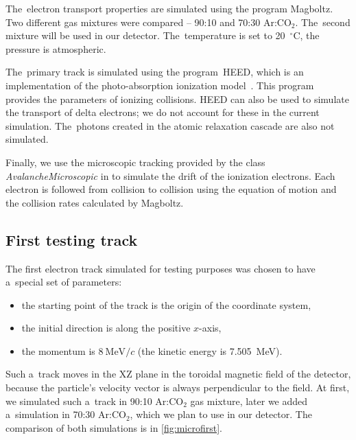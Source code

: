 		The~electron transport properties are simulated using the program Magboltz. Two different gas mixtures were compared -- 90:10 and 70:30 Ar:CO$_2$. The~second mixture will be used in our detector. The~temperature is set to 20~$^\circ$C, the pressure is atmospheric.
		
		The~primary track is simulated using the program~\ac{HEED}, which is an implementation of the photo-absorption ionization model~\cite{HEED}. This program provides the parameters of ionizing collisions. \ac{HEED} can also be used to simulate the transport of delta electrons; we do not account for these in the current simulation. The~photons created in the atomic relaxation cascade are also not simulated.
		
		Finally, we use the microscopic tracking provided by the class \textit{AvalancheMicroscopic} in \garfieldpp to simulate the drift of the ionization electrons. Each electron is followed from collision to collision using the equation of motion and the collision rates calculated by Magboltz.
		
		
		\subsection{First testing track}
		\label{sec:microfirst}
			The first electron track simulated for testing purposes was chosen to have a~special set of parameters:
				\begin{itemize}[nosep]
					\item the starting point of the track is the origin of the coordinate system,
					\item the initial direction is along the positive $x$-axis,
					\item the momentum is $8~\text{MeV}/c$ (the kinetic energy is 7.505~MeV).
				\end{itemize}
			Such a~track moves in the XZ plane in the toroidal magnetic field of the detector, because the particle's velocity vector is always perpendicular to the field. At first, we simulated such a~track in 90:10 Ar:CO$_2$ gas mixture, later we added a~simulation in 70:30 Ar:CO$_2$, which we plan to use in our detector. The comparison of both simulations is in \cref{fig:microfirst}.
			
